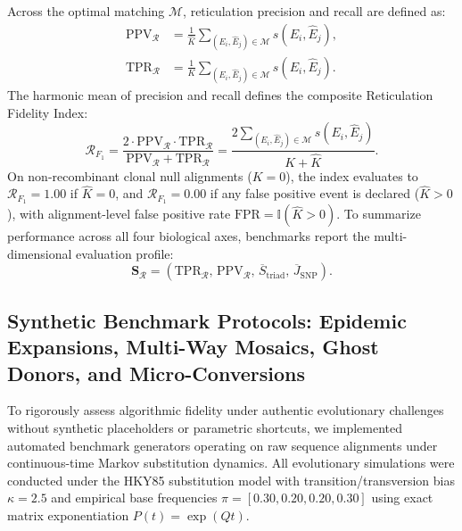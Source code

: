 Across the optimal matching $\mathcal{M}$, reticulation precision and recall are defined as:
\begin{align}
\text{PPV}_{\mathcal{R}} &= \frac{1}{\hat{K}} \sum_{(E_i, \hat{E}_j) \in \mathcal{M}} s(E_i, \hat{E}_j), \label{eq:methods_ppv_r} \\
\text{TPR}_{\mathcal{R}} &= \frac{1}{K} \sum_{(E_i, \hat{E}_j) \in \mathcal{M}} s(E_i, \hat{E}_j). \label{eq:methods_tpr_r}
\end{align}
The harmonic mean of precision and recall defines the composite Reticulation Fidelity Index:
\begin{equation}
\mathcal{R}_{F_1} = \frac{2 \cdot \text{PPV}_{\mathcal{R}} \cdot \text{TPR}_{\mathcal{R}}}{\text{PPV}_{\mathcal{R}} + \text{TPR}_{\mathcal{R}}} = \frac{2 \sum_{(E_i, \hat{E}_j) \in \mathcal{M}} s(E_i, \hat{E}_j)}{K + \hat{K}}.
\label{eq:methods_rf1}
\end{equation}
On non-recombinant clonal null alignments ($K = 0$), the index evaluates to $\mathcal{R}_{F_1} = 1.00$ if $\hat{K} = 0$, and $\mathcal{R}_{F_1} = 0.00$ if any false positive event is declared ($\hat{K} > 0$), with alignment-level false positive rate $\text{FPR} = \mathbb{I}(\hat{K} > 0)$.
To summarize performance across all four biological axes, benchmarks report the multi-dimensional evaluation profile:
\begin{equation}
\mathbf{S}_{\mathcal{R}} = \left(\text{TPR}_{\mathcal{R}},\, \text{PPV}_{\mathcal{R}},\, \overline{S}_{\text{triad}},\, \overline{J}_{\text{SNP}}\right).
\label{eq:methods_score_profile}
\end{equation}

\subsection{Synthetic Benchmark Protocols: Epidemic Expansions, Multi-Way Mosaics, Ghost Donors, and Micro-Conversions}
\label{subsec:methods_benchmark_protocols}

To rigorously assess algorithmic fidelity under authentic evolutionary challenges without synthetic placeholders or parametric shortcuts, we implemented automated benchmark generators operating on raw sequence alignments under continuous-time Markov substitution dynamics.
All evolutionary simulations were conducted under the HKY85 substitution model with transition/transversion bias $\kappa = 2.5$ and empirical base frequencies $\pi = [0.30, 0.20, 0.20, 0.30]$ using exact matrix exponentiation $P(t) = \exp(Q t)$.

